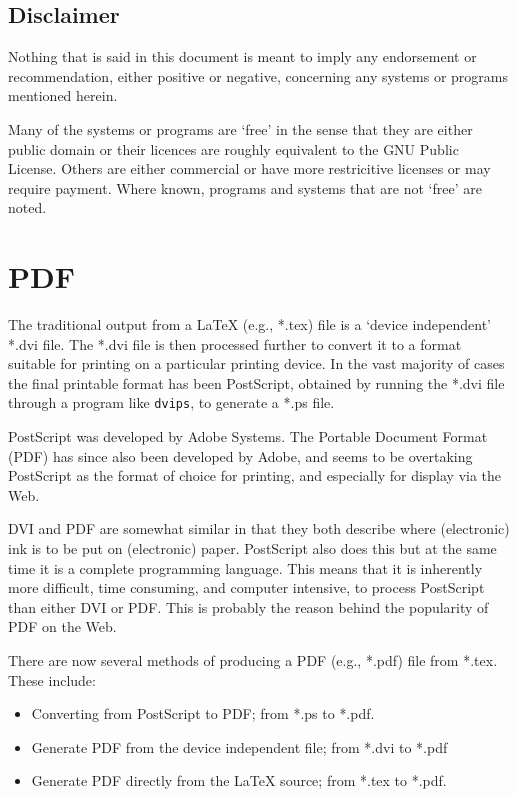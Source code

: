 \documentclass[11pt]{article}
\newcommand{\file}[1]{\textsf{#1}}
\newcommand{\program}[1]{\texttt{#1}}
\newcommand{\latex}{LaTeX}
\begin{document}
\subsection{Disclaimer}

    Nothing that is said in this document is meant to imply any endorsement
or recommendation, either
positive or negative, concerning any systems or programs mentioned herein.

    Many of the systems or programs are `free' in the sense that they are 
either public domain or their licences are roughly equivalent to the GNU
Public License.
Others are either commercial or have more restricitive
licenses or may require payment. Where known, programs and systems that are
not `free' are noted.

\section{PDF}

    The traditional output from a \latex{} (e.g., \file{*.tex}) file is
a `device independent' \file{*.dvi} file. The \file{*.dvi} file is then processed further to convert
it to a format suitable for printing on a particular printing device. 
In the vast majority of cases the final printable format
has been PostScript, obtained by running the \file{*.dvi} file through a 
program like \program{dvips}, to generate a \file{*.ps} file.

    PostScript was developed by Adobe Systems. The Portable Document 
Format (PDF) has since also been developed by Adobe, and seems to be 
overtaking PostScript as the format of choice for printing, and especially
for display via the Web.

    DVI and PDF are somewhat similar in that they both describe where
(electronic) ink is to be put on (electronic) paper. PostScript also
does this but at the same time it is a complete programming language.
This means that it is inherently more difficult, time consuming, and computer
intensive, to process PostScript than either DVI or PDF. This is probably
the reason behind the popularity of PDF on the Web.

    There are now several methods of producing a PDF (e.g., \file{*.pdf})
file from \file{*.tex}. These include:
\begin{itemize}
\item Converting from PostScript to PDF;
      from \file{*.ps} to \file{*.pdf}.
\item Generate PDF from the device independent file; 
      from \file{*.dvi} to \file{*.pdf}
\item Generate PDF directly from the \latex{} source; 
      from \file{*.tex} to \file{*.pdf}.
\end{itemize}
\end{document}
